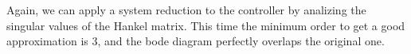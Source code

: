   \begin{figure}[h]
  	\centering
  	\hfill
  	\caption{}
  \end{figure}

Again, we can apply a system reduction to the controller by analizing the singular values of the Hankel matrix. This time the minimum order to get a good approximation is 3, and the bode diagram perfectly overlaps the original one.\\


